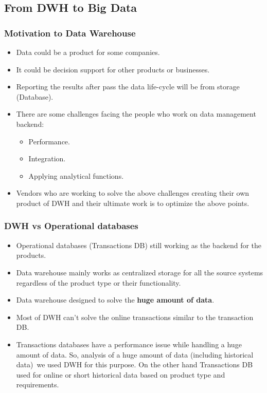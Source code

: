 

\subsection{From DWH to Big Data}
\begin{frame}
\frametitle{Motivation to Data Warehouse}
\begin{itemize}[<+->]
	\item Data could be a product for some companies.
	\item It could be decision support for other products or businesses.
	\item Reporting the results after pass the data life-cycle will be from storage (Database).
	\item There are some challenges facing the people who work on data management backend:
	\begin{itemize}
		\item Performance.
		\item Integration.
		\item Applying analytical functions. %
	\end{itemize}
	\item Vendors who are working to solve the above challenges creating their own product of DWH and their ultimate work is to optimize the above points.
\end{itemize}
\end{frame}


\begin{frame}
\frametitle{DWH vs Operational databases}
\begin{itemize}[<+->]
		\item Operational databases (Transactions DB) still working as the backend for the products.
		\item Data warehouse mainly works as centralized storage for all the source systems regardless of the product type or their functionality.
		\item Data warehouse designed to solve the \textbf{huge amount of data}.
		\item Most of DWH can't solve the online transactions similar to the transaction DB.
		\item Transactions databases have a performance issue while handling a huge amount of data. So, analysis of a huge amount of data (including historical data) we used DWH for this purpose. On the other hand Transactions DB used for online or short historical data based on product type and requirements.
\end{itemize}
\end{frame}


